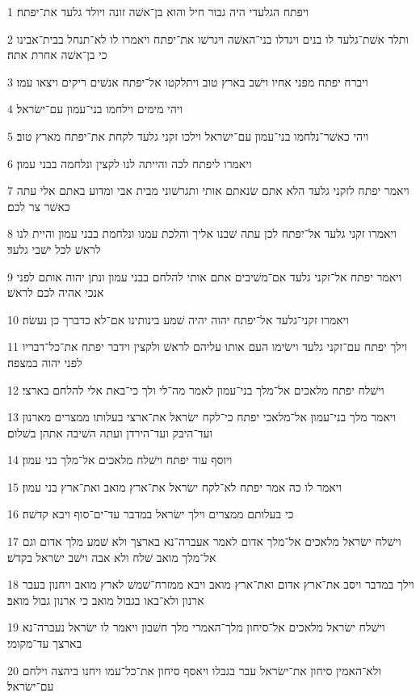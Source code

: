 \par 1 ויפתח הגלעדי היה גבור חיל והוא בן־אשׁה זונה ויולד גלעד את־יפתח׃
\par 2 ותלד אשׁת־גלעד לו בנים ויגדלו בני־האשׁה ויגרשׁו את־יפתח ויאמרו לו לא־תנחל בבית־אבינו כי בן־אשׁה אחרת אתה׃
\par 3 ויברח יפתח מפני אחיו וישׁב בארץ טוב ויתלקטו אל־יפתח אנשׁים ריקים ויצאו עמו׃
\par 4 ויהי מימים וילחמו בני־עמון עם־ישׂראל׃
\par 5 ויהי כאשׁר־נלחמו בני־עמון עם־ישׂראל וילכו זקני גלעד לקחת את־יפתח מארץ טוב׃
\par 6 ויאמרו ליפתח לכה והייתה לנו לקצין ונלחמה בבני עמון׃
\par 7 ויאמר יפתח לזקני גלעד הלא אתם שׂנאתם אותי ותגרשׁוני מבית אבי ומדוע באתם אלי עתה כאשׁר צר לכם׃
\par 8 ויאמרו זקני גלעד אל־יפתח לכן עתה שׁבנו אליך והלכת עמנו ונלחמת בבני עמון והיית לנו לראשׁ לכל ישׁבי גלעד׃
\par 9 ויאמר יפתח אל־זקני גלעד אם־משׁיבים אתם אותי להלחם בבני עמון ונתן יהוה אותם לפני אנכי אהיה לכם לראשׁ׃
\par 10 ויאמרו זקני־גלעד אל־יפתח יהוה יהיה שׁמע בינותינו אם־לא כדברך כן נעשׂה׃
\par 11 וילך יפתח עם־זקני גלעד וישׂימו העם אותו עליהם לראשׁ ולקצין וידבר יפתח את־כל־דבריו לפני יהוה במצפה׃
\par 12 וישׁלח יפתח מלאכים אל־מלך בני־עמון לאמר מה־לי ולך כי־באת אלי להלחם בארצי׃
\par 13 ויאמר מלך בני־עמון אל־מלאכי יפתח כי־לקח ישׂראל את־ארצי בעלותו ממצרים מארנון ועד־היבק ועד־הירדן ועתה השׁיבה אתהן בשׁלום׃
\par 14 ויוסף עוד יפתח וישׁלח מלאכים אל־מלך בני עמון׃
\par 15 ויאמר לו כה אמר יפתח לא־לקח ישׂראל את־ארץ מואב ואת־ארץ בני עמון׃
\par 16 כי בעלותם ממצרים וילך ישׂראל במדבר עד־ים־סוף ויבא קדשׁה׃
\par 17 וישׁלח ישׂראל מלאכים אל־מלך אדום לאמר אעברה־נא בארצך ולא שׁמע מלך אדום וגם אל־מלך מואב שׁלח ולא אבה וישׁב ישׂראל בקדשׁ׃
\par 18 וילך במדבר ויסב את־ארץ אדום ואת־ארץ מואב ויבא ממזרח־שׁמשׁ לארץ מואב ויחנון בעבר ארנון ולא־באו בגבול מואב כי ארנון גבול מואב׃
\par 19 וישׁלח ישׂראל מלאכים אל־סיחון מלך־האמרי מלך חשׁבון ויאמר לו ישׂראל נעברה־נא בארצך עד־מקומי׃
\par 20 ולא־האמין סיחון את־ישׂראל עבר בגבלו ויאסף סיחון את־כל־עמו ויחנו ביהצה וילחם עם־ישׂראל׃
